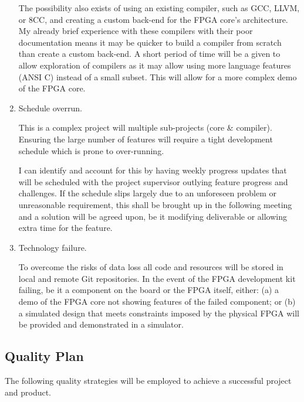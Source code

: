 \begin{enumerate}
{The possibility also exists of using an existing compiler, such as GCC, LLVM, or 8CC, and creating a custom back-end for the FPGA core's architecture. My already brief experience with these compilers with their poor documentation means it may be quicker to build a compiler from scratch than create a custom back-end. A short period of time will be a given to allow exploration of compilers as it may allow using more language features (ANSI C) instead of a small subset. This will allow for a more complex demo of the FPGA core.
}

\item{
Schedule overrun. 

This is a complex project will multiple sub-projects (core \& compiler). Ensuring the large number of features will require a tight development schedule which is prone to over-running.

I can identify and account for this by having weekly progress updates that will be scheduled with the project supervisor outlying feature progress and challenges. If the schedule slips largely due to an unforeseen problem or unreasonable requirement, this shall be brought up in the following meeting and a solution will be agreed upon, be it modifying deliverable or allowing extra time for the feature.
}

\item{Technology failure. 

To overcome the risks of data loss all code and resources will be stored in local and remote Git repositories.
In the event of the FPGA development kit failing, be it a component on the board or the FPGA itself, either: (a) a demo of the FPGA core not showing features of the failed component; or (b) a simulated design that meets constraints imposed by the physical FPGA will be provided and demonstrated in a simulator.
}
\end{enumerate}


\subsection*{Quality Plan}
The following quality strategies will be employed to achieve a successful project and product.

